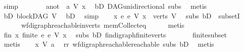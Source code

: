 \begin{isabellebody}
\ simp\ \ \isanewline
\ \ \isamarkupfalse%
\ \isamarkupfalse%
\ a{\isacharunderscore}{\kern0pt}not{\isacharcolon}{\kern0pt}\ {\isachardoublequoteopen}{\isasymnot}\ a\ {\isasymrightarrow}\isactrlsup {\isacharasterisk}{\kern0pt}\isactrlbsub V\isactrlesub \ x{\isachardoublequoteclose}\ \isamarkupfalse%
\ bD\ DAG{\isachardot}{\kern0pt}unidirectional\ subs\ \isamarkupfalse%
\ metis\isanewline
\ \ \isamarkupfalse%
\ bD{}{\isacharcolon}{\kern0pt}\ {\isachardoublequoteopen}blockDAG\ V{\isachardoublequoteclose}\ \isamarkupfalse%
\ bD\ \isamarkupfalse%
\ simp\isanewline
\ \ \isamarkupfalse%
\ {\isachardoublequoteopen}{\isasymforall}x{\isachardot}{\kern0pt}\ {\isacharbraceleft}{\kern0pt}e{\isachardot}{\kern0pt}\ e\ {\isasymrightarrow}\isactrlsup {\isacharasterisk}{\kern0pt}\isactrlbsub V\isactrlesub \ x{\isacharbraceright}{\kern0pt}\ {\isasymsubseteq}\ verts\ V{\isachardoublequoteclose}\ \isamarkupfalse%
\ subs\ bD{}\ \ subsetI\isanewline
\ \ \ \ \ \ wf{\isacharunderscore}{\kern0pt}digraph{\isachardot}{\kern0pt}reachable{\isacharunderscore}{\kern0pt}in{\isacharunderscore}{\kern0pt}verts{\isacharparenleft}{\kern0pt}{}{\isacharparenright}{\kern0pt}\ mem{\isacharunderscore}{\kern0pt}Collect{\isacharunderscore}{\kern0pt}eq\isanewline
\ \ \ \ \isamarkupfalse%
\ metis\ \isanewline
\ \ \isamarkupfalse%
\ \isamarkupfalse%
\ fin{\isacharcolon}{\kern0pt}\ {\isachardoublequoteopen}{\isasymforall}x{\isachardot}{\kern0pt}\ finite\ {\isacharbraceleft}{\kern0pt}e{\isachardot}{\kern0pt}\ e\ {\isasymrightarrow}\isactrlsup {\isacharasterisk}{\kern0pt}\isactrlbsub V\isactrlesub \ x{\isacharbraceright}{\kern0pt}{\isachardoublequoteclose}\ \isamarkupfalse%
\ subs\ bD{}\ fin{\isacharunderscore}{\kern0pt}digraph{\isachardot}{\kern0pt}finite{\isacharunderscore}{\kern0pt}verts\ \isanewline
\ \ \ \ \ \ finite{\isacharunderscore}{\kern0pt}subset\isanewline
\ \ \ \ \isamarkupfalse%
\ metis\isanewline
\ \ \isamarkupfalse%
\ {\isachardoublequoteopen}x\ {\isasymrightarrow}\isactrlsup {\isacharasterisk}{\kern0pt}\isactrlbsub V\isactrlesub \ a{\isachardoublequoteclose}\ \isamarkupfalse%
\ rr\ wf{\isacharunderscore}{\kern0pt}digraph{\isachardot}{\kern0pt}reachable{}{\isacharunderscore}{\kern0pt}reachable\ subs\ bD{}\ \isamarkupfalse%
\ metis\isanewline

\end{isabellebody}
